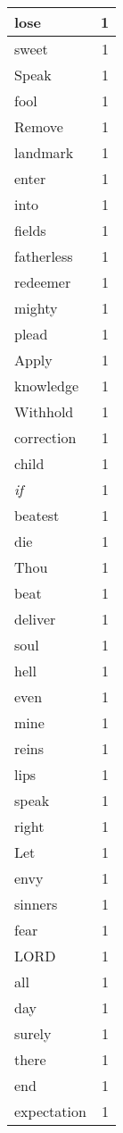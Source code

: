 \begin{center}
\begin{longtable}{l|r}
lose & 1\\ \hline 
sweet & 1\\ \hline 
Speak & 1\\ \hline 
fool & 1\\ \hline 
Remove & 1\\ \hline 
landmark & 1\\ \hline 
enter & 1\\ \hline 
into & 1\\ \hline 
fields & 1\\ \hline 
fatherless & 1\\ \hline 
redeemer & 1\\ \hline 
mighty & 1\\ \hline 
plead & 1\\ \hline 
Apply & 1\\ \hline 
knowledge & 1\\ \hline 
Withhold & 1\\ \hline 
correction & 1\\ \hline 
child & 1\\ \hline 
\emph{if} & 1\\ \hline 
beatest & 1\\ \hline 
die & 1\\ \hline 
Thou & 1\\ \hline 
beat & 1\\ \hline 
deliver & 1\\ \hline 
soul & 1\\ \hline 
hell & 1\\ \hline 
even & 1\\ \hline 
mine & 1\\ \hline 
reins & 1\\ \hline 
lips & 1\\ \hline 
speak & 1\\ \hline 
right & 1\\ \hline 
Let & 1\\ \hline 
envy & 1\\ \hline 
sinners & 1\\ \hline 
fear & 1\\ \hline 
LORD & 1\\ \hline 
all & 1\\ \hline 
day & 1\\ \hline 
surely & 1\\ \hline 
there & 1\\ \hline 
end & 1\\ \hline 
expectation & 1\\ \hline 

\end{longtable}
\end{center}
